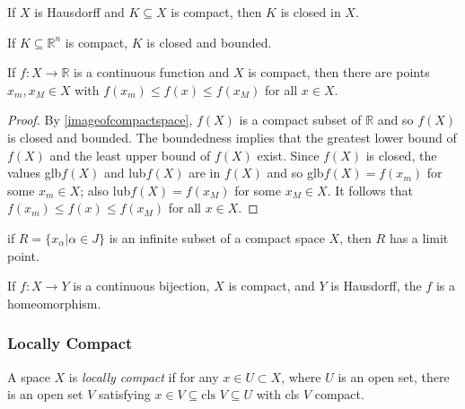 \begin{proposition}
If $X$ is Hausdorff and $K \subseteq X$ is compact, then $K$ is closed in $X$.
\end{proposition}

\begin{corollary}
If $K \subseteq \mathbb{R}^n$ is compact, $K$ is closed and bounded.
\end{corollary}

\begin{theorem}
\label{extremevaluetheorem}
If $f: X \rightarrow \mathbb{R}$ is a continuous function and $X$ is compact, then there are points $x_m, x_M \in X$ with $f(x_m) \leq f(x) \leq f(x_M)$ for all $x \in X$.
\end{theorem}

\begin{proof}
By \ref{imageofcompactspace}, $f(X)$ is a compact subset of $\mathbb{R}$ and so $f(X)$ is closed and bounded. The boundedness implies that the greatest lower bound of $f(X)$ and the least upper bound of $f(X)$ exist.
Since $f(X)$ is closed, the values glb$f(X)$ and lub$f(X)$ are in $f(X)$ and so glb$f(X) = f(x_m)$ for some $x_m \in X$; also lub$f(X) = f(x_M)$ for some $x_M \in X$. It follows that $f(x_m) \leq f(x) \leq f(x_M)$ for all
$x \in X$.
\end{proof}

\begin{proposition}
if $R = \{ x_{\alpha} | \alpha \in J \}$ is an infinite subset of a compact space $X$, then $R$ has a limit point.
\end{proposition}

\begin{proposition}
\label{gtet}
If $f: X \rightarrow Y$ is a continuous bijection, $X$ is compact, and $Y$ is Hausdorff, the $f$ is a homeomorphism. 
\end{proposition}

\subsubsection{Locally Compact}\label{locallycompact}
A space $X$ is \emph{locally compact} if for any $x \in U \subset X$, where $U$
is an open set, there is an open set $V$ satisfying $x \in V \subseteq \textrm{cls } V \subseteq U$ with cls $V$ compact.